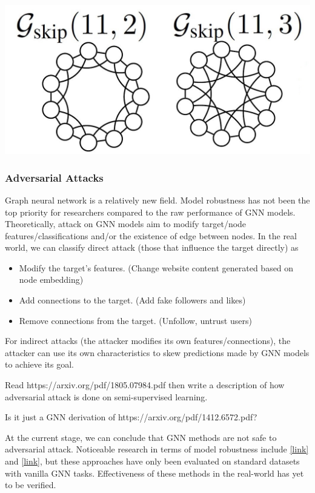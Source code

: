 {
\centering
\includegraphics[width=0.5\linewidth]{notes/img/l18_p45_wl.JPG} \par
}

\subsubsection{Adversarial Attacks}

Graph neural network is a relatively new field. Model robustness has not been the top priority for researchers compared to the raw performance of GNN models. Theoretically, attack on GNN models aim to modify target/node features/classifications and/or the existence of edge between nodes. In the real world, we can classify direct attack (those that influence the target directly) as 

\begin{itemize}
    \item Modify the target's features. (Change website content generated based on node embedding)
    
    \item Add connections to the target. (Add fake followers and likes)
    
    \item Remove connections from the target. (Unfollow, untrust users)
\end{itemize}{}

For indirect attacks (the attacker modifies its own features/connections), the attacker can use its own characteristics to skew predictions made by GNN models to achieve its goal.

\begin{todo}
    Read https://arxiv.org/pdf/1805.07984.pdf then write a description of how adversarial attack is done on semi-supervised learning.
    
    Is it just a GNN derivation of https://arxiv.org/pdf/1412.6572.pdf?
\end{todo}{}

At the current stage, we can conclude that GNN methods are not safe to adversarial attack. Noticeable research in terms of model robustness include \href{https://arxiv.org/pdf/1905.03679.pdf}{[link]} and \href{http://pengcui.thumedialab.com/papers/RGCN.pdf}{[link]}, but these approaches have only been evaluated on standard datasets with vanilla GNN tasks. Effectiveness of these methods in the real-world has yet to be verified.